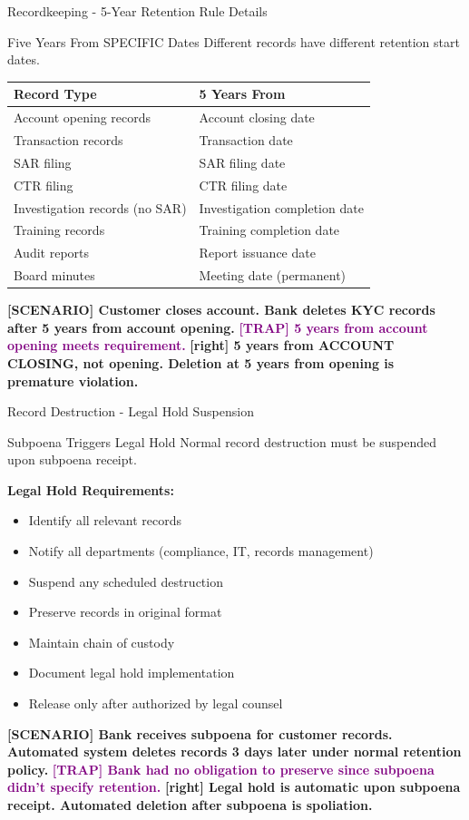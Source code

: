 \documentclass[11pt,a4paper]{beamer}
\newcommand{\trap}[1]{\textcolor{purple}{\textbf{[TRAP] #1}}}
\newcommand{\correct}[1]{\textcolor{green!50!black}{\textbf{[right] #1}}}
\newcommand{\scenario}[1]{\textcolor{blue!70!black}{\textbf{[SCENARIO] #1}}}
\begin{document}

\begin{frame}{Recordkeeping - 5-Year Retention Rule Details}
\begin{block}{Five Years From SPECIFIC Dates}
Different records have different retention start dates.
\end{block}
\begin{tabular}{p{}|p{}}
\hline
\rowcolor{lightgray}
\textbf{Record Type} & \textbf{5 Years From} \\
\hline
Account opening records & Account closing date \\
Transaction records & Transaction date \\
SAR filing & SAR filing date \\
CTR filing & CTR filing date \\
Investigation records (no SAR) & Investigation completion date \\
Training records & Training completion date \\
Audit reports & Report issuance date \\
Board minutes & Meeting date (permanent) \\
\hline
\end{tabular}
\scenario{Customer closes account. Bank deletes KYC records after 5 years from account opening.}
\trap{5 years from account opening meets requirement.}
\correct{5 years from ACCOUNT CLOSING, not opening. Deletion at 5 years from opening is premature violation.}
\end{frame}

\begin{frame}{Record Destruction - Legal Hold Suspension}
\begin{block}{Subpoena Triggers Legal Hold}
Normal record destruction must be suspended upon subpoena receipt.
\end{block}
\textbf{Legal Hold Requirements:}
\begin{itemize}
\item Identify all relevant records
\item Notify all departments (compliance, IT, records management)
\item Suspend any scheduled destruction
\item Preserve records in original format
\item Maintain chain of custody
\item Document legal hold implementation
\item Release only after authorized by legal counsel
\end{itemize}
\scenario{Bank receives subpoena for customer records. Automated system deletes records 3 days later under normal retention policy.}
\trap{Bank had no obligation to preserve since subpoena didn't specify retention.}
\correct{Legal hold is automatic upon subpoena receipt. Automated deletion after subpoena is spoliation.}
\end{frame}
\end{document}
